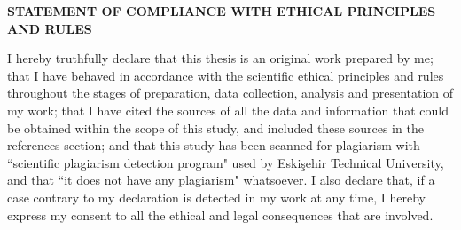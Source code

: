 \begin{flushright}
	\paramdate
\end{flushright} \bigskip

\begin{center}
\textbf{STATEMENT OF COMPLIANCE WITH ETHICAL PRINCIPLES AND RULES}
\end{center}
\vspace{3\baselineskip}

I hereby truthfully declare that this thesis is an original work prepared by me; that I have behaved in accordance with the scientific ethical principles and rules throughout the stages of preparation, data collection, analysis and presentation of my work; that I have cited the sources of all the data and information that could be obtained within the scope of this study, and included these sources in the references section; and that this study has been scanned for plagiarism with ``scientific plagiarism detection program" used by Eskişehir Technical University, and that ``it does not have any plagiarism" whatsoever. I also declare that, if a case contrary to my declaration is detected in my work at any time, I hereby express my consent to all the ethical and legal consequences that are involved.
\vspace{3\baselineskip}

\hspace{0.6\textwidth} \parbox{0.3\textwidth}{\centering \dotfill \\ \bigskip \paramauthor}

\newpage
